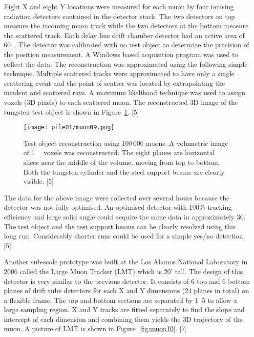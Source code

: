 \documentclass[twoside,titlepage,11pt,twocolumn,a4paper]{article}
\begin{document}
Eight X and eight Y locations were measured for each muon by four
ionising radiation detectors contained in the detector stack. The two
detectors on top measure the incoming muon track while the two
detectors at the bottom measure the scattered track. Each delay line
drift chamber detector had an active area of
\unit{60}{\square{\centi\metre}}. The detector was calibrated
with no test object to determine the precision of the position
measurement. A Windows based acquisition program was used to collect
the data. The reconstruction was approximated using the following
simple technique. Multiple scattered tracks were approximated to have
only a single scattering event and the point of scatter was located by
extrapolating the incident and scattered rays. A maximum likelihood
technique was used to assign voxels (3D pixels) to each scattered
muon. The reconstructed 3D image of the tungsten test object is shown
in Figure~\ref{fig:muon09}. [5]

\begin{figure}
  \texttt{[image: pile01/muon09.png]}
  \caption{Test object reconstruction using 100\,000 muons. A
    volumetric image of \unit{1}{\cubic{\centi\metre}}
    voxels was reconstructed. The eight planes are horizontal slices
    near the middle of the volume, moving from top to bottom. Both the
    tungsten cylinder and the steel support beams are clearly
    visible. [5]}
  \label{fig:muon09}
\end{figure}

The data for the above image were collected over several hours because
the detector was not fully optimised. An optimised detector with 100\%
tracking efficiency and large solid angle could acquire the same data
in approximately \unit{30}{\minute}. The test object and the test
support beams can be clearly resolved using this long
run. Considerably shorter runs could be used for a simple yes/no
detection. [5]

Another sub-scale prototype was built at the Los Alamos National
Laboratory in 2006 called the Large Muon Tracker (LMT) which is 20'
tall. The design of this detector is very similar to the previous
detector. It consists of 6 top and 6 bottom planes of drift tube
detectors for each X and Y dimensions (24 planes in total) on a
flexible frame. The top and bottom sections are separated by
\unit{1.5}{\metre} to allow a large sampling region. X and Y tracks
are fitted separately to find the slope and intercept of each
dimension and combining them yields the 3D trajectory of the muon. A
picture of LMT is shown in Figure~\ref{fig:muon10}. [7]
\end{document}
